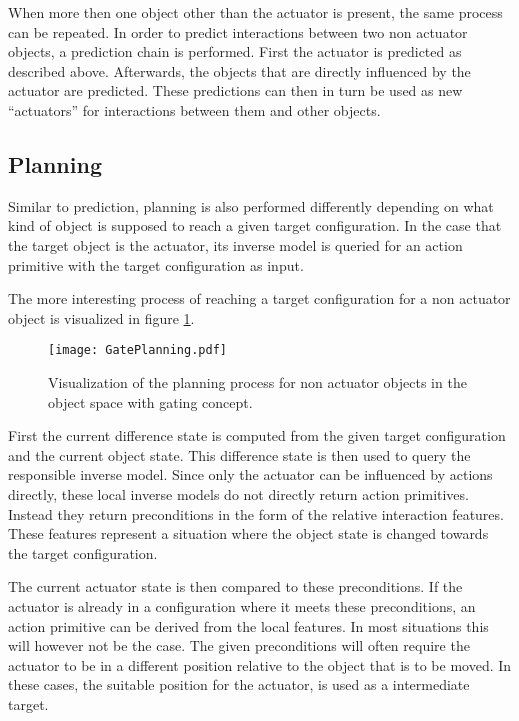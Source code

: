 When more then one object other than the actuator is present, the same process can be repeated. In order to predict interactions between two non actuator objects, a prediction chain is performed. First the actuator is predicted as described above. Afterwards, the objects that are directly influenced by the actuator are predicted. These predictions can then in turn be used as new \enquote{actuators} for interactions between them and other objects. 


\subsection{Planning \label{sec:gatePlanning}}

Similar to prediction, planning is also performed differently depending on what kind of object is supposed to reach a given target configuration. In the case that the target object is the actuator, its inverse model is queried for an action primitive with the target configuration as input. 

The more interesting process of reaching a target configuration for a non actuator object is visualized in figure \ref{fig:GatePlanning}.

\begin{figure}
	\centering
	\texttt{[image: GatePlanning.pdf]}
	\caption{Visualization of the planning process for non actuator objects in the object space with gating concept. }%
		\label{fig:GatePlanning}
\end{figure}
	
First the current difference state is computed from the given target configuration and the current object state. This difference state is then used to query the responsible inverse model. Since only the actuator can be influenced by actions directly, these local inverse models do not directly return action primitives. Instead they return preconditions in the form of the relative interaction features. These features represent a situation where the object state is changed towards the target configuration. 
	
The current actuator state is then compared to these preconditions. If the actuator is already in a configuration where it meets these preconditions, an action primitive can be derived from the local features. In most situations this will however not be the case. The given preconditions will often require the actuator to be in a different position relative to the object that is to be moved. In these cases, the suitable position for the actuator, is used as a intermediate target. 

